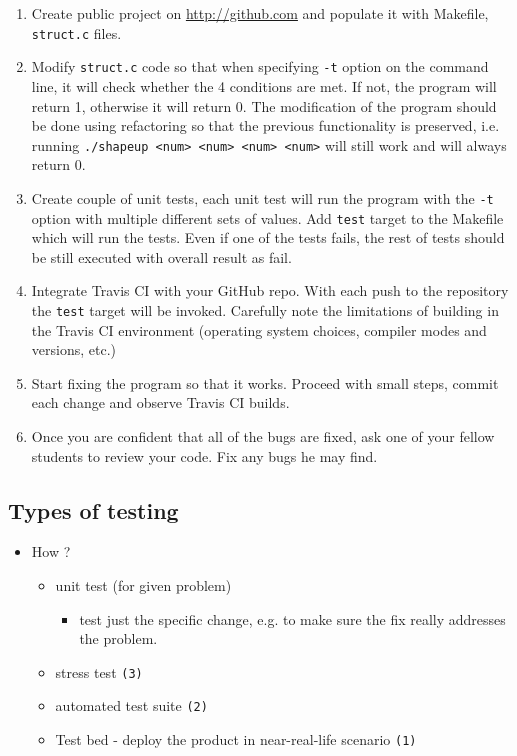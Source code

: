 {\begin{enumerate}
design test cases to prevent regressions.
\item Create public project on \url{http://github.com} and populate it with
Makefile, \texttt{struct.c} files.
\item Modify \texttt{struct.c} code so that when specifying \texttt{-t} option
on the command line, it will check whether the 4 conditions are met. If not,
the program will return 1, otherwise it will return 0. The modification of the
program should be done using refactoring so that the previous functionality is
preserved, i.e. running \texttt{./shapeup <num> <num> <num> <num>} will still
work and will always return 0.
\item Create couple of unit tests, each unit test will run the program with
the \texttt{-t} option with multiple different sets of values.
Add \texttt{test} target to the Makefile which will run the tests. Even if one
of the tests fails, the rest of tests should be still executed with overall
result as fail.
\item Integrate Travis CI with your GitHub repo. With each push to the
repository the \texttt{test} target will be invoked. Carefully note the
limitations of building in the Travis CI environment (operating system choices,
compiler modes and versions, etc.)
\item Start fixing the program so that it works. Proceed with small steps,
commit each change and observe Travis CI builds.
\item Once you are confident that all of the bugs are fixed, ask one of your
fellow students to review your code. Fix any bugs he may find.
\end{enumerate}
}

\subsection{Types of testing}

\begin{itemize}
  \item How ?
  \begin{itemize}
    \item unit test (for given problem)
    \begin{itemize}
      \item test just the specific change, e.g. to make sure the fix really
      addresses the problem.
    \end{itemize}
    \item stress test \texttt{(3)}
    \item automated test suite \texttt{(2)}
    \item Test bed - deploy the product in near-real-life scenario \texttt{(1)}
  \end{itemize}
\end{itemize}

